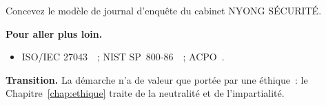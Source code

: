 \begin{boxexo}[title={\ding{45}\quad Exercice~2.10. Modèle de journal \niveauexpert}]
Concevez le modèle de journal d'enquête du cabinet NYONG SÉCURITÉ.
\end{boxexo}

\bigskip

\begin{boxinfo}
\textbf{Pour aller plus loin.}
\begin{itemize}
    \item ISO/IEC 27043~\cite{iso27043}~; NIST SP~800-86~\cite{nist80086}~;
          ACPO~\cite{acpo2012}.
\end{itemize}
\end{boxinfo}

\begin{boxinfo}
\textbf{Transition.} La démarche n'a de valeur que portée par une éthique~:
le Chapitre~\ref{chap:ethique} traite de la neutralité et de l'impartialité.
\end{boxinfo}

